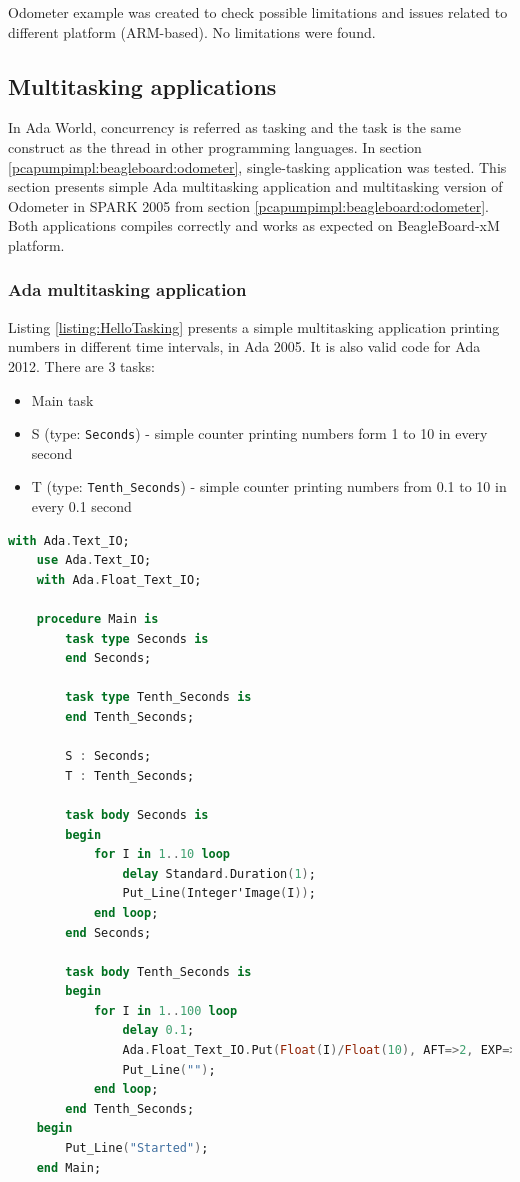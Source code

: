 Odometer example was created to check possible limitations and issues related to different platform (ARM-based). No limitations were found.


\subsection{Multitasking applications}
\label{pcapumpimpl:beagleboard:multitasking}

In Ada World, concurrency is referred as tasking and the task is the same construct as the thread in other programming languages. In section \ref{pcapumpimpl:beagleboard:odometer}, single-tasking application was tested. This section presents simple Ada multitasking application and multitasking version of Odometer in SPARK 2005 from section \ref{pcapumpimpl:beagleboard:odometer}. Both applications compiles correctly and works as expected on BeagleBoard-xM platform.

\subsubsection{Ada multitasking application}

Listing \ref{listing:HelloTasking} presents a simple multitasking application printing numbers in different time intervals, in Ada 2005. It is also valid code for Ada 2012. There are 3 tasks:
\begin{itemize}
    \item Main task
    \item S (type: \lstinline{Seconds}) - simple counter printing numbers form 1 to 10 in every second
    \item T (type: \lstinline{Tenth_Seconds}) - simple counter printing numbers from 0.1 to 10 in every 0.1 second
\end{itemize}

\begin{lstlisting}[language=ada, frame=single, gobble=0, caption={Simple multitask application in Ada}, label={listing:HelloTasking}]
	with Ada.Text_IO;
	use Ada.Text_IO;
	with Ada.Float_Text_IO;

	procedure Main is
	    task type Seconds is
	    end Seconds;

	    task type Tenth_Seconds is
	    end Tenth_Seconds;

	    S : Seconds;
	    T : Tenth_Seconds;

	    task body Seconds is
	    begin
	        for I in 1..10 loop
	            delay Standard.Duration(1);
	            Put_Line(Integer'Image(I));
	        end loop;
	    end Seconds;

	    task body Tenth_Seconds is
	    begin
	        for I in 1..100 loop            
	            delay 0.1;            
	            Ada.Float_Text_IO.Put(Float(I)/Float(10), AFT=>2, EXP=>0);
	            Put_Line("");
	        end loop;
	    end Tenth_Seconds;
	begin
	    Put_Line("Started");
	end Main;
\end{lstlisting} 

